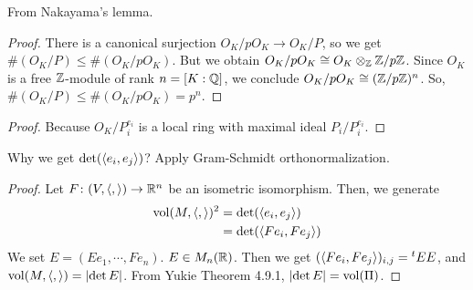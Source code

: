 \begin{rem}
  From Nakayama's lemma.
\end{rem}


\begin{proof}
There is a canonical surjection $O_K/pO_K \to O_K /P$, so we get $\# (O_K /P) \leq \# (O_K/pO_K)$. But we obtain $O_K/pO_K \cong O_K \otimes_{{\mathbb Z}} {\mathbb Z} / p {\mathbb Z}$. Since $O_K$ is a free ${\mathbb Z}$-module of rank $n = [K:{\mathbb Q}]$, we conclude $O_K/pO_K \cong ({\mathbb Z} / p {\mathbb Z} )^n $. So, $\# (O_K /P) \leq \# (O_K/pO_K) = p^n$.
\end{proof}



\barquo{
\[
\bigoplus_{i=1}^r O_K/P_i^{e_i} = \bigoplus_{i=1}^r (O_K/P_i^{e_i})_{P_i}
\]
}
\begin{proof}
  Because $O_K/P_i^{e_i}$ is a local ring with maximal ideal $P_i/P_i^{e_i}$.
\end{proof}


\begin{rem}
  Why we get $\det (\langle e_i,e_j \rangle)$? Apply Gram-Schmidt orthonormalization.
\end{rem}


\begin{proof}
  Let $F \colon (V, \langle , \rangle) \to {\mathbb R}^n$ be  an isometric isomorphism. Then, we generate
  \begin{align*}
    \operatorname{vol} (M, \langle , \rangle )^2 &= \det (\langle e_i,e_j \rangle) \\
    &= \det (\langle Fe_i,Fe_j \rangle)
  \end{align*}
  We set $E = (Ee_1, \cdots, Fe_n)$. $E \in M_n({\mathbb R})$. Then we get $( \langle Fe_i,Fe_j \rangle)_{i,j} = {}^tE E$, and $\operatorname{vol} (M, \langle , \rangle ) = \left \lvert \det E  \right \rvert$. From Yukie\cite{雪江線形} Theorem 4.9.1, $\left \lvert \det E  \right \rvert = \operatorname{vol}(\Pi)$.
\end{proof}



